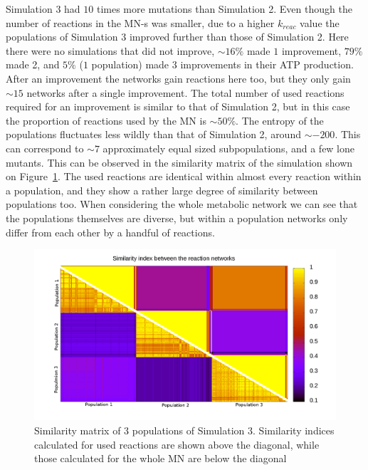 \documentclass[a4paper,12pt]{article}
\begin{document}
Simulation 3 had $10$ times more mutations than Simulation 2. Even though the number of reactions in the MN-s was smaller, due to a higher $k_{reac}$ value the populations of Simulation 3 improved further than those of Simulation 2. Here there were no simulations that did not improve, $\sim 16\%$ made $1$ improvement, $79\%$ made 2, and $5\%$ ($1$ population) made $3$ improvements in their ATP production. After an improvement the networks gain reactions here too, but they only gain $\sim 15$ networks after a single improvement. The total number of used reactions required for an improvement is similar to that of Simulation 2, but in this case the proportion of reactions used by the MN is $\sim 50\%$. The entropy of the populations fluctuates less wildly than that of Simulation 2, around $\sim -200$. This can correspond to $\sim 7$ approximately equal sized subpopulations, and a few lone mutants. This can be observed in the similarity matrix of the simulation shown on Figure~\ref{fig:simmatrix_sim3}. The used reactions are identical within almost every reaction within a population, and they show a rather large degree of similarity between populations too. When considering the whole metabolic network we can see that the populations themselves are diverse, but within a population networks only differ from each other by a handful of reactions. 




\begin{figure}[htpb]
	\centering
	\includegraphics[width=0.8\linewidth]{simmatrix_sim3.png}
	\caption{Similarity matrix of 3 populations of Simulation 3. Similarity indices calculated for used reactions are shown above the diagonal, while those calculated for the whole MN are below the diagonal}
	\label{fig:simmatrix_sim3}
\end{figure}
\end{document}
